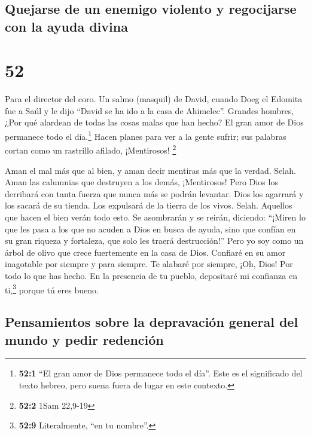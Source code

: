 \hypertarget{quejarse-de-un-enemigo-violento-y-regocijarse-con-la-ayuda-divina}{%
\subsection{Quejarse de un enemigo violento y regocijarse con la ayuda
divina}\label{quejarse-de-un-enemigo-violento-y-regocijarse-con-la-ayuda-divina}}

\hypertarget{section-51}{%
\section{52}\label{section-51}}

Para el director del coro. Un salmo (masquil) de David, cuando Doeg el
Edomita fue a Saúl y le dijo ``David se ha ido a la casa de Ahimelec''.
 Grandes hombres, ¿Por qué alardean de todas las cosas
malas que han hecho? El gran amor de Dios permanece todo el
día.\footnote{\textbf{52:1} ``El gran amor de Dios permanece todo el
  día''. Este es el significado del texto hebreo, pero suena fuera de
  lugar en este contexto.}  Hacen planes para ver a la
gente sufrir; sus palabras cortan como un rastrillo afilado,
¡Mentirosos! \footnote{\textbf{52:2} 1Sam 22,9-19}

 Aman el mal más que al bien, y aman decir mentiras más
que la verdad. Selah.  Aman las calumnias que destruyen a
los demás, ¡Mentirosos!  Pero Dios los derribará con tanta
fuerza que nunca más se podrán levantar. Dios los agarrará y los sacará
de su tienda. Los expulsará de la tierra de los vivos. Selah.
 Aquellos que hacen el bien verán todo esto. Se asombrarán
y se reirán, diciendo:  ``¡Miren lo que les pasa a los que
no acuden a Dios en busca de ayuda, sino que confían en su gran riqueza
y fortaleza, que solo les traerá destrucción!''  Pero yo
soy como un árbol de olivo que crece fuertemente en la casa de Dios.
Confiaré en su amor inagotable por siempre y para siempre.
 Te alabaré por siempre, ¡Oh, Dios! Por todo lo que has
hecho. En la presencia de tu pueblo, depositaré mi confianza en
ti,\footnote{\textbf{52:9} Literalmente, ``en tu nombre''.} porque tú
eres bueno.

\hypertarget{pensamientos-sobre-la-depravaciuxf3n-general-del-mundo-y-pedir-redenciuxf3n-1}{%
\subsection{Pensamientos sobre la depravación general del mundo y pedir
redención}\label{pensamientos-sobre-la-depravaciuxf3n-general-del-mundo-y-pedir-redenciuxf3n-1}}

